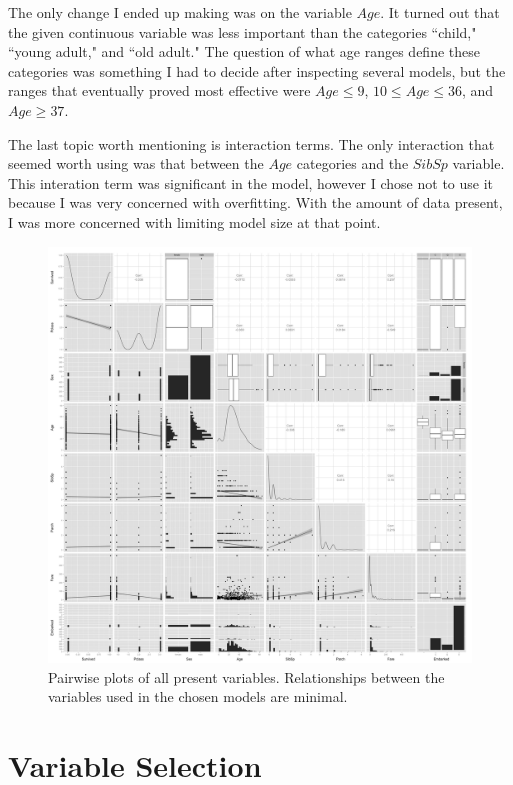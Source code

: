\documentclass[12pt]{article}
\begin{document}
The only change I ended up making was on the variable $Age$.  It turned out that the given continuous variable was less important than the categories ``child," ``young adult," and ``old adult."  The question of what age ranges define these categories was something I had to decide after inspecting several models, but the ranges that eventually proved most effective were $Age \leq 9$, $10 \leq Age \leq 36$, and $Age \geq 37$.

The last topic worth mentioning is interaction terms.  The only interaction that seemed worth using was that between the $Age$ categories and the $SibSp$ variable.  This interation term was significant in the model, however I chose not to use it because I was very concerned with overfitting.  With the amount of data present, I was more concerned with limiting model size at that point.

\begin{figure}[ht!]
\centering
\includegraphics[width=180mm]{pairs.png}
\caption{Pairwise plots of all present variables.  Relationships between the variables used in the chosen models are minimal.}
\end{figure}
%

\section{Variable Selection}
\end{document}

